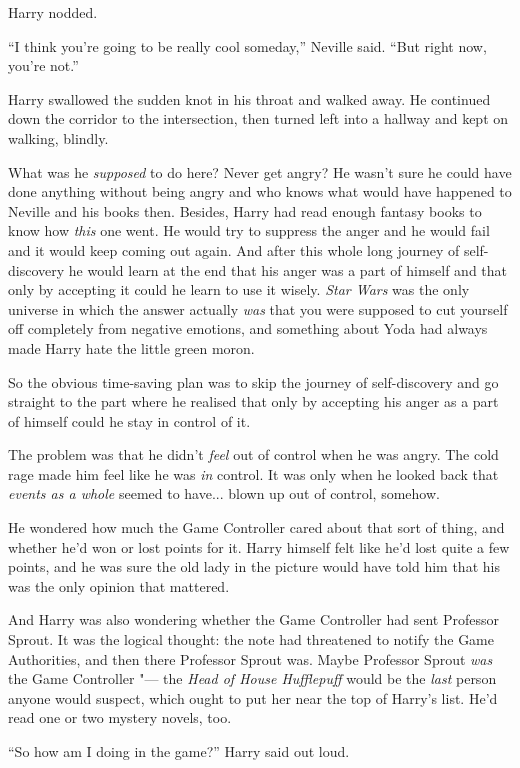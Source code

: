 Harry nodded.

``I think you're going to be really cool someday,'' Neville said. ``But
right now, you're not.''

Harry swallowed the sudden knot in his throat and walked away. He
continued down the corridor to the intersection, then turned left into a
hallway and kept on walking, blindly.

What was he \emph{supposed} to do here? Never get angry? He wasn't sure
he could have done anything without being angry and who knows what would
have happened to Neville and his books then. Besides, Harry had read
enough fantasy books to know how \emph{this} one went. He would try to
suppress the anger and he would fail and it would keep coming out again.
And after this whole long journey of self-discovery he would learn at
the end that his anger was a part of himself and that only by accepting
it could he learn to use it wisely. \emph{Star Wars} was the only
universe in which the answer actually \emph{was} that you were supposed
to cut yourself off completely from negative emotions, and something
about Yoda had always made Harry hate the little green moron.

So the obvious time-saving plan was to skip the journey of
self-discovery and go straight to the part where he realised that only
by accepting his anger as a part of himself could he stay in control of
it.

The problem was that he didn't \emph{feel} out of control when he was
angry. The cold rage made him feel like he was \emph{in} control. It was
only when he looked back that \emph{events as a whole} seemed to
have... blown up out of control, somehow.

He wondered how much the Game Controller cared about that sort of thing,
and whether he'd won or lost points for it. Harry himself felt like he'd
lost quite a few points, and he was sure the old lady in the picture
would have told him that his was the only opinion that mattered.

And Harry was also wondering whether the Game Controller had sent
Professor Sprout. It was the logical thought: the note had threatened to
notify the Game Authorities, and then there Professor Sprout was. Maybe
Professor Sprout \emph{was} the Game Controller "--- the \emph{Head of
House Hufflepuff} would be the \emph{last} person anyone would suspect,
which ought to put her near the top of Harry's list. He'd read one or
two mystery novels, too.

``So how am I doing in the game?'' Harry said out loud.

